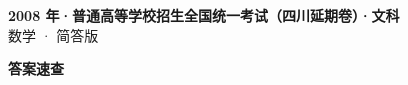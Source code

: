 \documentclass[zihao=-4, a4paper]{ctexart}
\begin{document}
\begin{center}
  {\Large\bfseries 2008 年·普通高等学校招生全国统一考试（四川延期卷）·文科}\\[4pt]
  {\large 数学 · 简答版}
\end{center}
\medskip
{}

\clearpage
{}
\begin{center}{\Large\bfseries 答案速查}\end{center}
\medskip

\end{document}
